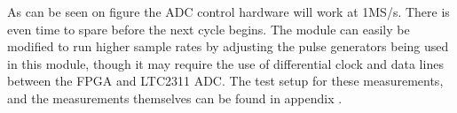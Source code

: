 As can be seen on figure  the ADC control hardware will work at 1MS/s. There is even time to spare before the next cycle begins. The module can easily be modified to run higher sample rates by adjusting the pulse generators being used in this module, though it may require the use of differential clock and data lines between the FPGA and LTC2311 ADC. The test setup for these measurements, and the measurements themselves can be found in appendix .
